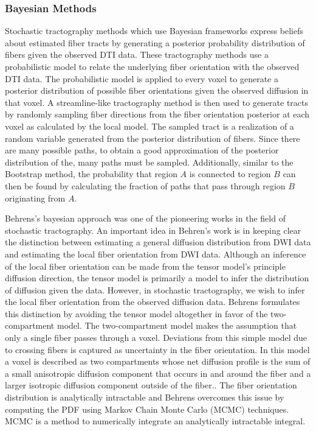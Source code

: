 \subsubsection{Bayesian Methods}
Stochastic tractography methods which use Bayesian frameworks express beliefs about estimated fiber tracts by generating a posterior probability distribution of fibers given the observed DTI data.   These tractography methods use a probabilistic model to relate the underlying fiber orientation with the observed DTI data.  The probabilistic model is applied to every voxel to generate a posterior distribution of possible fiber orientations given the observed diffusion in that voxel.  A streamline-like tractography method is then used to generate tracts by randomly sampling fiber directions from the fiber orientation posterior at each voxel as calculated by the local model.  The sampled tract is a realization of a random variable generated from the posterior distribution of fibers.  Since there are many possible paths, to obtain a good approximation of the posterior distribution of the, many paths must be sampled.  Additionally, similar to the Bootstrap method, the probability that region $A$ is connected to region $B$ can then be found by calculating the fraction of paths that pass through region $B$ originating from $A$.

Behrens's bayesian approach was one of the pioneering works in the field of stochastic tractography\cite{behrensMRM03}. An important idea in Behren's work is in keeping clear the distinction between estimating a general diffusion distribution from DWI data and estimating the local fiber orientation from DWI data.  Although an inference of the local fiber orientation can be made from the tensor model's principle diffusion direction, the tensor model is primarily a model to infer the distribution of diffusion given the data.  However, in stochastic tractography, we wish to infer the local fiber orientation from the observed diffusion data.  Behrens formulates this distinction by avoiding the tensor model altogether in favor of the two-compartment model. The two-compartment model makes the assumption that only a single fiber passes through a voxel.  Deviations from this simple model due to crossing fibers is captured as uncertainty in the fiber orientation.  In this model a voxel is described as two compartments whose net diffusion profile is the sum of a small anisotropic diffusion component that occurs in and around the fiber and a larger isotropic diffusion component outside of the fiber.\cite{behrensMRM03}.  The fiber orientation distribution is analytically intractable and Behrens overcomes this issue by computing the PDF using Markov Chain Monte Carlo (MCMC) techniques.  MCMC is a method to numerically integrate an analytically intractable integral.  
